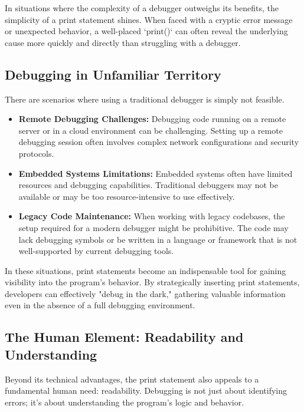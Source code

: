 \documentclass{article}
\begin{document}
In situations where the complexity of a debugger outweighs its benefits, the simplicity of a print statement shines.  When faced with a cryptic error message or unexpected behavior, a well-placed `print()` can often reveal the underlying cause more quickly and directly than struggling with a debugger.

\subsection*{Debugging in Unfamiliar Territory}

There are scenarios where using a traditional debugger is simply not feasible.

\begin{itemize}
    \item \textbf{Remote Debugging Challenges:} Debugging code running on a remote server or in a cloud environment can be challenging. Setting up a remote debugging session often involves complex network configurations and security protocols.

    \item \textbf{Embedded Systems Limitations:}  Embedded systems often have limited resources and debugging capabilities.  Traditional debuggers may not be available or may be too resource-intensive to use effectively.

    \item \textbf{Legacy Code Maintenance:}  When working with legacy codebases, the setup required for a modern debugger might be prohibitive.  The code may lack debugging symbols or be written in a language or framework that is not well-supported by current debugging tools.
\end{itemize}

In these situations, print statements become an indispensable tool for gaining visibility into the program's behavior. By strategically inserting print statements, developers can effectively "debug in the dark," gathering valuable information even in the absence of a full debugging environment.

\subsection*{The Human Element: Readability and Understanding}

Beyond its technical advantages, the print statement also appeals to a fundamental human need: readability.  Debugging is not just about identifying errors; it's about understanding the program's logic and behavior.
\end{document}
